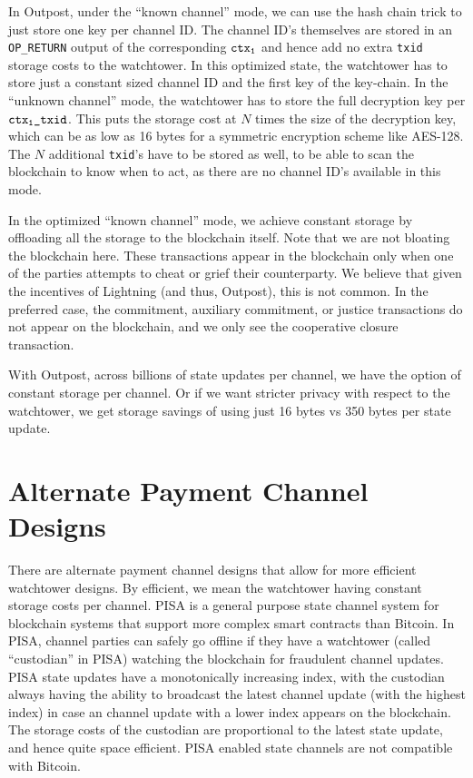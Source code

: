 In Outpost, under the ``known channel'' mode, we can use the hash chain trick to just store one key per channel ID. The channel ID's themselves are stored in an \texttt{OP\_RETURN} output of the corresponding $\texttt{ctx\textsubscript{1}}$ and hence add no extra \texttt{txid} storage costs to the watchtower. In this optimized state, the watchtower has to store just a constant sized channel ID and the first key of the key-chain. In the ``unknown channel'' mode, the watchtower has to store the full decryption key per $\texttt{ctx\textsubscript{1}\_txid}$. This puts the storage cost at $N$ times the size of the decryption key, which can be as low as 16 bytes for a symmetric encryption scheme like AES-128. The $N$ additional \texttt{txid}'s have to be stored as well, to be able to scan the blockchain to know when to act, as there are no channel ID's available in this mode.

In the optimized ``known channel'' mode, we achieve constant storage by offloading all the storage to the blockchain itself. Note that we are not bloating the blockchain here. These transactions appear in the blockchain only when one of the parties attempts to cheat or grief their counterparty. We believe that given the incentives of Lightning (and thus, Outpost), this is not common. In the preferred case, the commitment, auxiliary commitment, or justice transactions do not appear on the blockchain, and we only see the cooperative closure transaction.

With Outpost, across billions of state updates per channel, we have the option of constant storage per channel. Or if we want stricter privacy with respect to the watchtower, we get storage savings of using just 16 bytes vs 350 bytes per state update.

\section {Alternate Payment Channel Designs}
There are alternate payment channel designs that allow for more efficient watchtower designs. By efficient, we mean the watchtower having constant storage costs per channel. PISA \cite{pisa} is a general purpose state channel system for blockchain systems that support more complex smart contracts than Bitcoin. In PISA, channel parties can safely go offline if they have a watchtower (called ``custodian'' in PISA) watching the blockchain for fraudulent channel updates. PISA state updates have a monotonically increasing index, with the custodian always having the ability to broadcast the latest channel update (with the highest index) in case an channel update with a lower index appears on the blockchain. The storage costs of the custodian are proportional to the latest state update, and hence quite space efficient. PISA enabled state channels are not compatible with Bitcoin.

